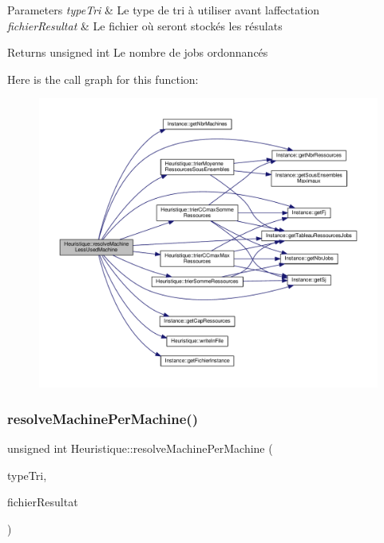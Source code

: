 \begin{DoxyParams}{Parameters}
{\em type\+Tri} & Le type de tri à utiliser avant l\textquotesingle{}affectation \\
\hline
{\em fichier\+Resultat} & Le fichier où seront stockés les résulats \\
\hline
\end{DoxyParams}
\begin{DoxyReturn}{Returns}
unsigned int Le nombre de jobs ordonnancés 
\end{DoxyReturn}
Here is the call graph for this function\+:\nopagebreak
\begin{figure}[H]
\begin{center}
\leavevmode
\includegraphics[width=350pt]{classHeuristique_aee20a4baec95a33533a6e13029c437df_cgraph}
\end{center}
\end{figure}
\mbox{\label{classHeuristique_ad8a57ed34b0c46f6d65e501ee99da498}} 
\subsubsection{\texorpdfstring{resolve\+Machine\+Per\+Machine()}{resolveMachinePerMachine()}}
{\footnotesize\ttfamily unsigned int Heuristique\+::resolve\+Machine\+Per\+Machine (\begin{DoxyParamCaption}\item[{Q\+String}]{type\+Tri,  }\item[{Q\+String}]{fichier\+Resultat }\end{DoxyParamCaption})}



